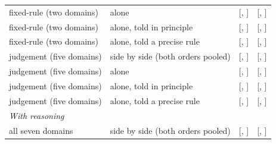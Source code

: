 \begin{table}[t]
\begin{tabular}{llcc}
fixed-rule (two domains) & alone & \AloneNoReasoningFixedRule{} [\AloneNoReasoningFixedRuleLo{}, \AloneNoReasoningFixedRuleHi{}] & \CutoffHalfAloneNoReasoningFixedRule{} [\CutoffHalfAloneNoReasoningFixedRuleLo{}, \CutoffHalfAloneNoReasoningFixedRuleHi{}] \\
fixed-rule (two domains) & alone, told in principle & \ToldPrincipleNoReasoningFixedRule{} [\ToldPrincipleNoReasoningFixedRuleLo{}, \ToldPrincipleNoReasoningFixedRuleHi{}] & \CutoffHalfToldPrincipleNoReasoningFixedRule{} [\CutoffHalfToldPrincipleNoReasoningFixedRuleLo{}, \CutoffHalfToldPrincipleNoReasoningFixedRuleHi{}] \\
fixed-rule (two domains) & alone, told a precise rule & \ToldRuleNoReasoningFixedRule{} [\ToldRuleNoReasoningFixedRuleLo{}, \ToldRuleNoReasoningFixedRuleHi{}] & \CutoffHalfToldRuleNoReasoningFixedRule{} [\CutoffHalfToldRuleNoReasoningFixedRuleLo{}, \CutoffHalfToldRuleNoReasoningFixedRuleHi{}] \\
judgement (five domains) & side by side (both orders pooled) & \SideBySideNoReasoningJudgement{} [\SideBySideNoReasoningJudgementLo{}, \SideBySideNoReasoningJudgementHi{}] & \CutoffHalfSideBySideNoReasoningJudgement{} [\CutoffHalfSideBySideNoReasoningJudgementLo{}, \CutoffHalfSideBySideNoReasoningJudgementHi{}] \\
judgement (five domains) & alone & \AloneNoReasoningJudgement{} [\AloneNoReasoningJudgementLo{}, \AloneNoReasoningJudgementHi{}] & \CutoffHalfAloneNoReasoningJudgement{} [\CutoffHalfAloneNoReasoningJudgementLo{}, \CutoffHalfAloneNoReasoningJudgementHi{}] \\
judgement (five domains) & alone, told in principle & \ToldPrincipleNoReasoningJudgement{} [\ToldPrincipleNoReasoningJudgementLo{}, \ToldPrincipleNoReasoningJudgementHi{}] & \CutoffHalfToldPrincipleNoReasoningJudgement{} [\CutoffHalfToldPrincipleNoReasoningJudgementLo{}, \CutoffHalfToldPrincipleNoReasoningJudgementHi{}] \\
judgement (five domains) & alone, told a precise rule & \ToldRuleNoReasoningJudgement{} [\ToldRuleNoReasoningJudgementLo{}, \ToldRuleNoReasoningJudgementHi{}] & \CutoffHalfToldRuleNoReasoningJudgement{} [\CutoffHalfToldRuleNoReasoningJudgementLo{}, \CutoffHalfToldRuleNoReasoningJudgementHi{}] \\
\multicolumn{4}{l}{\textit{With reasoning}} \\
all seven domains & side by side (both orders pooled) & \SideBySideReasoning{} [\SideBySideReasoningLo{}, \SideBySideReasoningHi{}] & \CutoffHalfSideBySideReasoning{} [\CutoffHalfSideBySideReasoningLo{}, \CutoffHalfSideBySideReasoningHi{}] \\

\end{tabular}
\end{table}
